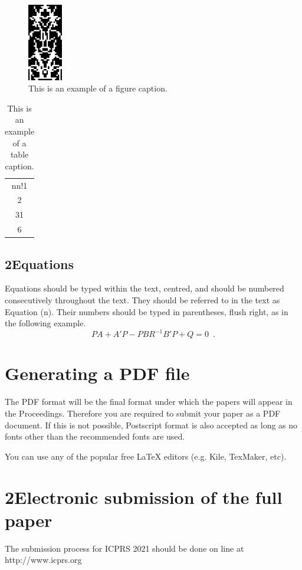 \documentclass[10pt]{article}
\begin{document}
\begin{figure}[h]
\centering
\includegraphics[width=1.5cm]{fig1}
\caption{\label{tab1}This is an example of a figure caption.} 
\end{figure}


\begin{table}[h]
\begin{center}

\begin{tabular}{c}
nn!1 \\
2 \\
31 \\
6 \\
\end{tabular}
\end{center}
\caption{\label{tab1}This is an example of a table caption.}
\end{table}

\subsection{2Equations}
Equations should be typed within the text, centred, and should
be numbered consecutively throughout the text. They should
be referred to in the text as Equation (n). Their numbers
should be typed in parentheses, flush right, as in the following
example.
\begin{equation}
	    PA + A'P - PBR^{-1}B'P + Q  =  0 \enspace.
\end{equation}

\section{Generating a {PDF} file}
The PDF format will be the final format under which the
papers will appear in the Proceedings. Therefore you are
required to submit your paper as a PDF document. If this is not
possible, Postscript format is also accepted as long as no fonts
other than the recommended fonts are used.

You can use any of the popular free LaTeX editors (e.g. Kile, TexMaker, etc).

\section{2Electronic submission of the full paper}
The submission process for ICPRS 2021 should be done on
line at http://www.icprs.org
\end{document}
